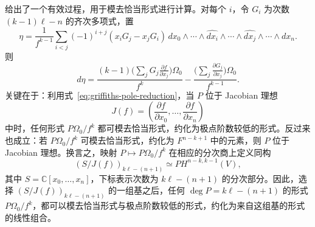  给出了一个有效过程，用于模去恰当形式进行计算。对每个 $i$，令 $G_i$ 为次数 $(k-1)\ell-n$ 的齐次多项式，置
\[
\eta=\frac1{f^{k-1}}\sum_{i<j}(-1)^{i+j}(x_iG_j-x_jG_i)
\,dx_0\wedge\cdots\wedge\widehat{dx_i}\wedge\cdots
\wedge\widehat{dx_j}\wedge\cdots\wedge dx_n.
\]
则
\begin{equation}\label{eq:griffiths-pole-reduction}
d\eta=
\frac{(k-1)\bigl(\sum_jG_j\frac{\partial f}{\partial x_j}\bigr)\Omega_0}{f^k}
-\frac{\bigl(\sum_j\frac{\partial G_j}{\partial x_j}\bigr)\Omega_0}{f^{k-1}}.
\end{equation}
关键在于：利用式~\eqref{eq:griffiths-pole-reduction}，当 $P$ 位于 Jacobian 理想
\[
J(f)=\left(\frac{\partial f}{\partial x_0},\ldots,
\frac{\partial f}{\partial x_n}\right)
\]
中时，任何形式 $P\Omega_0/f^k$ 都可模去恰当形式，约化为极点阶数较低的形式。反过来也成立：若 $P\Omega_0/f^k$ 可模去恰当形式，约化为 $F^{n-k+1}$ 中的元素，则 $P$ 位于 Jacobian 理想。换言之，映射 $P\mapsto P\Omega_0/f^k$ 在相应的分次商上定义同构
\begin{equation}\label{eq:jacobian-hodge-isomorphism}
(S/J(f))_{k\ell-(n+1)}\simeq PH^{n-k,k-1}(V),
\end{equation}
其中 $S=\mathbb C[x_0,\ldots,x_n]$，下标表示次数为 $k\ell-(n+1)$ 的分次部分。因此，选择 $(S/J(f))_{k\ell-(n+1)}$ 的一组基之后，任何 $\deg P=k\ell-(n+1)$ 的形式 $P\Omega_0/f^k$，都可以模去恰当形式与极点阶数较低的形式，约化为来自这组基的形式的线性组合。

